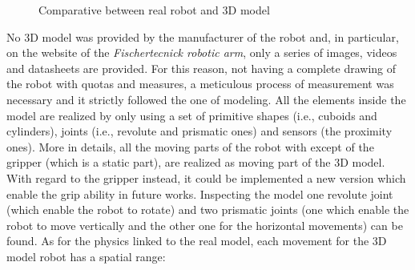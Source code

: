 \begin{figure}[h]
\centering
{}
\qquad
{}
\caption{Comparative between real robot and 3D model}
\label{comparative_models}
\end{figure}

No 3D model was provided by the manufacturer of the robot and, in particular, on the website of the \textit{Fischertecnick robotic arm}\cite{3DRobot291:online}, only a series of images, videos and datasheets are provided.
For this reason, not having a complete drawing of the robot with quotas and measures, a meticulous process of measurement was necessary and it strictly followed the one of modeling.
All the elements inside the model are realized by only using a set of primitive shapes (i.e., cuboids and cylinders), joints (i.e., revolute and prismatic ones) and sensors (the proximity ones). 
More in details, all the moving parts of the robot with except of the gripper (which is a static part), are realized as moving part of the 3D model.
With regard to the gripper instead, it could be implemented a new version which enable the grip ability in future works. Inspecting the model one revolute joint (which enable the robot to rotate) and two prismatic joints (one which enable the robot to move vertically and the other one for the horizontal movements) can be found. As for the physics linked to the real model, each movement for the 3D model robot has a spatial range:

